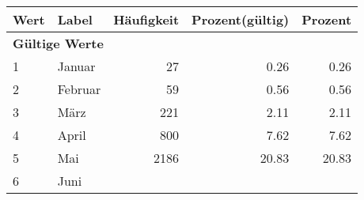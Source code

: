      \begin{longtable}{lXrrr}
     \toprule
     \textbf{Wert} & \textbf{Label} & \textbf{Häufigkeit} & \textbf{Prozent(gültig)} & \textbf{Prozent} \\
     \endhead
     \midrule
     \multicolumn{5}{l}{\textbf{Gültige Werte}}\\

     1 &
     \multicolumn{1}{X}{ Januar   } &


       \num{27} &
       \num[round-mode=places,round-precision=2]{0.26} &
         \num[round-mode=places,round-precision=2]{0.26} \\

     2 &
     \multicolumn{1}{X}{ Februar   } &


       \num{59} &
       \num[round-mode=places,round-precision=2]{0.56} &
         \num[round-mode=places,round-precision=2]{0.56} \\

     3 &
     \multicolumn{1}{X}{ März   } &


       \num{221} &
       \num[round-mode=places,round-precision=2]{2.11} &
         \num[round-mode=places,round-precision=2]{2.11} \\

     4 &
     \multicolumn{1}{X}{ April   } &


       \num{800} &
       \num[round-mode=places,round-precision=2]{7.62} &
         \num[round-mode=places,round-precision=2]{7.62} \\

     5 &
     \multicolumn{1}{X}{ Mai   } &


       \num{2186} &
       \num[round-mode=places,round-precision=2]{20.83} &
         \num[round-mode=places,round-precision=2]{20.83} \\

     6 &
     \multicolumn{1}{X}{ Juni   } &



\end{longtable}
